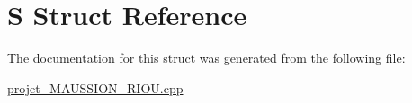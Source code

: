 \hypertarget{structS}{\section{\-S \-Struct \-Reference}
\label{structS}
}


\-The documentation for this struct was generated from the following file\-:\begin{DoxyCompactItemize}
\item 
\hyperlink{projet__MAUSSION__RIOU_8cpp}{projet\-\_\-\-M\-A\-U\-S\-S\-I\-O\-N\-\_\-\-R\-I\-O\-U.\-cpp}\end{DoxyCompactItemize}
